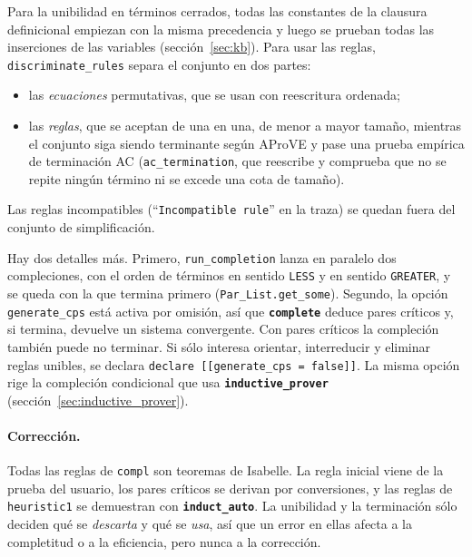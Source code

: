 \documentclass[11pt,a4paper]{article}
\newcommand{\isa}[1]{\texttt{#1}}
\newcommand{\cmd}[1]{\textbf{\texttt{#1}}}
\theoremstyle{definition}
\theoremstyle{remark}
\begin{document}
Para la unibilidad en términos cerrados, todas las constantes de la clausura
definicional empiezan con la misma precedencia y luego se prueban todas las
inserciones de las variables (sección~\ref{sec:kb}). Para usar las reglas,
\isa{discriminate\_rules} separa el conjunto en dos partes:
\begin{itemize}[nosep]
  \item las \emph{ecuaciones} permutativas, que se usan con reescritura ordenada;
  \item las \emph{reglas}, que se aceptan de una en una, de menor a mayor tamaño,
        mientras el conjunto siga siendo terminante según AProVE y pase una prueba
        empírica de terminación AC (\isa{ac\_termination}, que reescribe y comprueba
        que no se repite ningún término ni se excede una cota de tamaño).
\end{itemize}
Las reglas incompatibles (``\isa{Incompatible rule}'' en la traza) se quedan fuera
del conjunto de simplificación.

Hay dos detalles más. Primero, \isa{run\_completion} lanza en paralelo dos
compleciones, con el orden de términos en sentido \isa{LESS} y en sentido
\isa{GREATER}, y se queda con la que termina primero (\isa{Par\_List.get\_some}).
Segundo, la opción \isa{generate\_cps} está activa por omisión, así que
\cmd{complete} deduce pares críticos y, si termina, devuelve un sistema
convergente. Con pares críticos la compleción también puede no terminar. Si sólo
interesa orientar, interreducir y eliminar reglas unibles, se declara
\isa{declare [[generate\_cps = false]]}. La misma opción rige la compleción
condicional que usa \cmd{inductive\_prover} (sección~\ref{sec:inductive_prover}).

\paragraph{Corrección.}
Todas las reglas de \isa{compl} son teoremas de Isabelle. La regla inicial viene de
la prueba del usuario, los pares críticos se derivan por conversiones, y las reglas
de \isa{heuristic1} se demuestran con \cmd{induct\_auto}. La unibilidad y la
terminación sólo deciden qué se \emph{descarta} y qué se \emph{usa}, así que un
error en ellas afecta a la completitud o a la eficiencia, pero nunca a la corrección.
\end{document}

